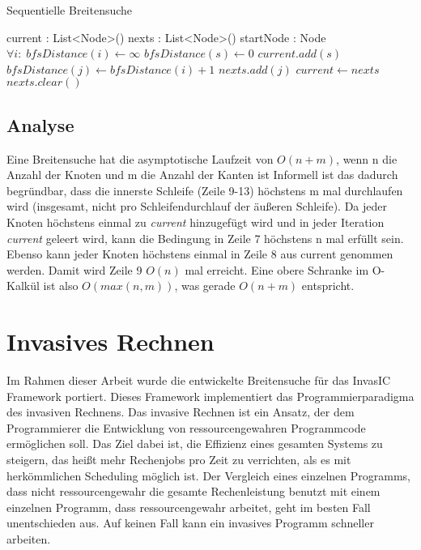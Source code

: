 \begin{algorithm}
	\caption{Sequentielle Breitensuche}
	\label{alg:sequential_bfs}
	\begin{algorithmic}[1]
		\State current : List<Node>()
		\State nexts : List<Node>()
		\State startNode : Node
		\State  $\forall i: \; bfsDistance(i) \gets \infty$
		\State $bfsDistance(s) \gets 0$
		\State $current.add(s)$
						\State $bfsDistance(j) \gets bfsDistance(i) + 1$
						\State $nexts.add(j)$
					\EndIf
				\EndFor
			\EndFor
			\State $current \gets nexts$
			\State $nexts.clear()$
		\EndWhile
	\end{algorithmic}
\end{algorithm}


\subsection{Analyse} %
\label{sub:analyse}
Eine Breitensuche hat die asymptotische Laufzeit von $O(n + m)$, wenn n die Anzahl der Knoten und m die Anzahl der Kanten ist Informell ist das dadurch begründbar, dass die innerste Schleife (Zeile 9-13) höchstens m mal durchlaufen wird (insgesamt, nicht pro Schleifendurchlauf der äußeren Schleife). Da jeder Knoten höchstens einmal zu \textit{current} hinzugefügt wird und in jeder Iteration \textit{current} geleert wird, kann die Bedingung in Zeile 7 höchstens n mal erfüllt sein. Ebenso kann jeder Knoten höchstens einmal in Zeile 8 aus current genommen werden. Damit wird Zeile 9 $O(n)$ mal erreicht. Eine obere Schranke im O-Kalkül ist also $O(max(n,m))$, was gerade $O(n + m)$ entspricht.


\section{Invasives Rechnen} %
\label{sec:invasives_rechnen}
Im Rahmen dieser Arbeit wurde die entwickelte Breitensuche für das InvasIC Framework\cite{SWB-367212986} portiert. Dieses Framework implementiert das Programmierparadigma des invasiven Rechnens. Das invasive Rechnen ist ein Ansatz, der dem Programmierer die Entwicklung von ressourcengewahren Programmcode ermöglichen soll. Das Ziel dabei ist, die Effizienz eines gesamten Systems zu steigern, das heißt mehr Rechenjobs pro Zeit zu verrichten, als es mit herkömmlichen Scheduling möglich ist. Der Vergleich eines einzelnen Programms, dass nicht ressourcengewahr die gesamte Rechenleistung benutzt mit einem einzelnen Programm, dass ressourcengewahr arbeitet, geht im besten Fall unentschieden aus. Auf keinen Fall kann ein invasives Programm schneller arbeiten. %

